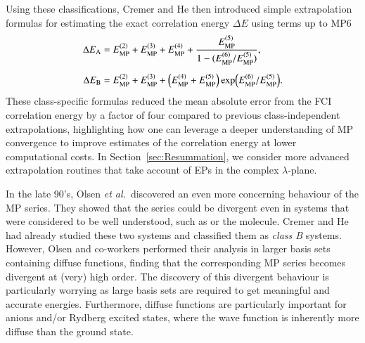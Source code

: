 \documentclass[aps,prb,reprint,noshowkeys,superscriptaddress]{revtex4-1}
\newcommand{\latin}[1]{#1}
\newcommand{\ie}{\latin{i.e.}}
\newcommand{\etal}{\textit{et al.}}
\newcommand{\Emp}{E_{\text{MP}}}
\begin{document}
Using these classifications, Cremer and He then introduced simple extrapolation formulas for estimating the 
exact correlation energy $\Delta E$ using terms up to MP6\cite{Cremer_1996}
\begin{subequations}
\begin{align}
\Delta E_{\text{A}}
    &= \Emp^{(2)} + \Emp^{(3)} + \Emp^{(4)}
     + \frac{\Emp^{(5)}}{1 - (\Emp^{(6)} / \Emp^{(5)})}, 
     \\[5pt]
\Delta E_{\text{B}} 
    &= \Emp^{(2)} + \Emp^{(3)} + \qty(\Emp^{(4)} + \Emp^{(5)}) \exp(\Emp^{(6)} / \Emp^{(5)}).
\end{align}
\end{subequations}
These class-specific formulas reduced the mean absolute error from the FCI correlation energy by a
factor of four compared to previous class-independent extrapolations,
highlighting how one can leverage a deeper understanding of MP convergence to improve estimates of 
the correlation energy at lower computational costs. 
In Section~\ref{sec:Resummation}, we consider more advanced extrapolation routines that take account of EPs in the complex $\lambda$-plane.

In the late 90's, Olsen \etal\ discovered an even more concerning behaviour of the MP series. \cite{Olsen_1996} 
They showed that the series could be divergent even in systems that were considered to be well understood, 
such as  or the  molecule. \cite{Olsen_1996, Christiansen_1996} 
Cremer and He had already studied these two systems and classified them as \textit{class B} systems.\cite{Cremer_1996} 
However, Olsen and co-workers performed their analysis in larger basis sets containing diffuse functions,
finding that the corresponding MP series becomes divergent at (very) high order.
The discovery of this divergent behaviour is particularly worrying as large basis sets 
are required to get meaningful and accurate energies.\cite{Loos_2019d,Giner_2019}
Furthermore, diffuse functions are particularly important for anions and/or Rydberg excited states, where the wave function 
is inherently more diffuse than the ground state.\cite{Loos_2018a,Loos_2020a}
\end{document}
